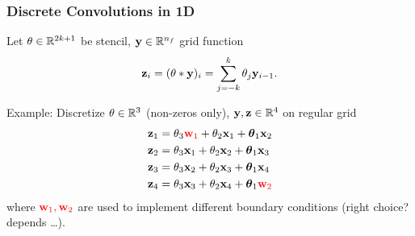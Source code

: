 \documentclass[12pt,fleqn,handout]{beamer}
\begin{document}
\begin{frame}\frametitle{Discrete Convolutions in 1D}
	Let $\theta \in\mathbb{R}^{2k+1}$ be stencil, ${\bf y} \in \mathbb{R}^{n_f}$ grid function
\begin{equation*}
		{\bf z}_i = (\theta * {\bf y})_i = \sum_{j=-k}^k \theta_{j} {\bf y}_{i-1}.
	\end{equation*}
	
	\bigskip
	\pause

	 Example: Discretize $\theta \in \mathbb{R}^3$ (non-zeros only), ${\bf y},{\bf z} \in \mathbb{R}^4$ on regular grid
	 \begin{align*}
	 	{\bf z}_1 & = \theta_3 \textcolor{red}{{\bf w}_1} + \theta_2 {\bf x}_1 + {\boldsymbol \theta}_1 {\bf x}_2 \\
	 	{\bf z}_2 & = \theta_3 {\bf x}_1 + \theta_2 {\bf x}_2 + {\boldsymbol \theta}_1 {\bf x}_3 \\
	 	{\bf z}_3 & = \theta_3 {\bf x}_2 + \theta_2 {\bf x}_3 + {\boldsymbol \theta}_1 {\bf x}_4 \\
	 	{\bf z}_4 & = \theta_3 {\bf x}_3 + \theta_2 {\bf x}_4 + {\boldsymbol \theta}_1 \textcolor{red}{{\bf w}_2}
	 \end{align*}
	 where $\textcolor{red}{{\bf w}_1, {\bf w}_2}$ are used to implement different boundary conditions (right choice? depends \ldots).
\end{frame}
\end{document}
